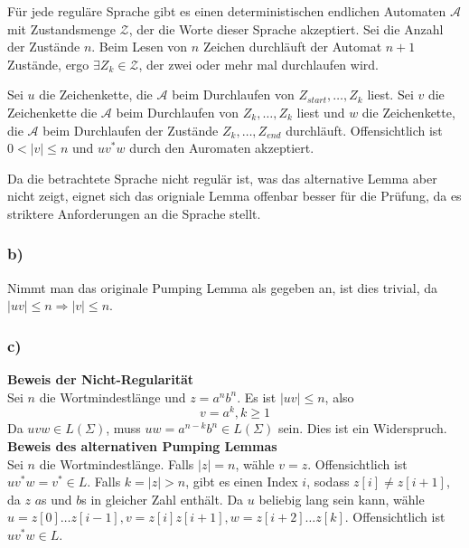 \documentclass{article}
\begin{document}
   F\"ur jede regul\"are Sprache gibt es einen deterministischen endlichen
   Automaten $\mathcal{A}$ mit Zustandsmenge $\mathcal{Z}$, der die Worte
   dieser Sprache akzeptiert. Sei die Anzahl der Zust\"ande $n$. Beim Lesen
   von $n$ Zeichen durchl\"auft der Automat $n+1$ Zust\"ande, ergo $\exists
   Z_k \in \mathcal{Z}$, der zwei oder mehr mal durchlaufen wird. 

   Sei $u$ die
   Zeichenkette, die $\mathcal{A}$ beim Durchlaufen von
   $Z_{start},\ldots,Z_k$ liest. Sei $v$ die Zeichenkette die $\mathcal{A}$
   beim Durchlaufen von $Z_k,\ldots,Z_k$ liest und $w$ die Zeichenkette, die
   $\mathcal{A}$ beim Durchlaufen der Zust\"ande $Z_k,\ldots,Z_{end}$
   durchl\"auft. Offensichtlich ist $0 < |v| \le n$ und $uv^*w$ durch den
   Auromaten akzeptiert.

   Da die betrachtete Sprache nicht regul\"ar ist, was das alternative Lemma
   aber nicht zeigt, eignet sich das origniale Lemma offenbar besser f\"ur
   die Pr\"ufung, da es striktere Anforderungen an die Sprache stellt.

   \subsubsection{b)}

   Nimmt man das originale Pumping Lemma als gegeben an, ist dies trivial, da
   $|uv| \le n \Rightarrow |v| \le n$.

   \subsubsection{c)}

   \textbf{Beweis der Nicht-Regularit\"at}\\[\baselineskip]
   Sei $n$ die Wortmindestl\"ange und $z = a^nb^n$. Es ist $|uv| \le n$, also
   \begin{equation*}
      v = a^k, k \ge 1
   \end{equation*}
   Da $uvw \in L(\Sigma)$, muss $uw = a^{n-k}b^n\in L(\Sigma)$ sein. Dies ist
   ein Widerspruch.\\[\baselineskip]

   \noindent\textbf{Beweis des alternativen Pumping Lemmas}\\[\baselineskip]
   Sei $n$ die Wortmindestl\"ange. Falls $|z| = n$, w\"ahle $v = z$.
   Offensichtlich ist $uv^*w = v^* \in L$. Falls $k = |z| > n$, gibt es einen
   Index $i$, sodass $z[i]\neq z[i+1]$, da $z$ $a$s und $b$s in gleicher Zahl
   enth\"alt. Da $u$ beliebig lang sein kann, w\"ahle $u = z[0]\ldots z[i-1], 
   v = z[i]z[i+1], w = z[i+2]\ldots z[k]$. Offensichtlich ist $uv^*w \in L$.
\end{document}
